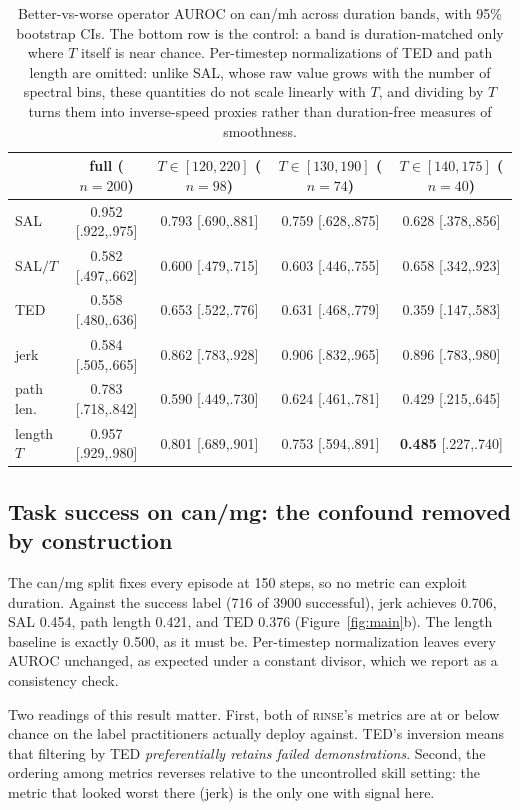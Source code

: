 \documentclass[10pt]{article}
\newcommand{\rinse}{\textsc{rinse}}
\begin{document}
\begin{table}[t]
\centering
\small
\begin{tabular}{lcccc}
\toprule
& full ($n{=}200$) & $T \in [120,220]$ ($n{=}98$) & $T \in [130,190]$ ($n{=}74$) & $T \in [140,175]$ ($n{=}40$) \\
\midrule
SAL       & 0.952 [.922,.975] & 0.793 [.690,.881] & 0.759 [.628,.875] & 0.628 [.378,.856] \\
SAL$/T$   & 0.582 [.497,.662] & 0.600 [.479,.715] & 0.603 [.446,.755] & 0.658 [.342,.923] \\
TED       & 0.558 [.480,.636] & 0.653 [.522,.776] & 0.631 [.468,.779] & 0.359 [.147,.583] \\
jerk      & 0.584 [.505,.665] & 0.862 [.783,.928] & 0.906 [.832,.965] & 0.896 [.783,.980] \\
path len. & 0.783 [.718,.842] & 0.590 [.449,.730] & 0.624 [.461,.781] & 0.429 [.215,.645] \\
\midrule
length $T$ & 0.957 [.929,.980] & 0.801 [.689,.901] & 0.753 [.594,.891] & \textbf{0.485} [.227,.740] \\
\bottomrule
\end{tabular}
\caption{Better-vs-worse operator AUROC on can/mh across duration bands,
with 95\% bootstrap CIs. The bottom row is the control: a band is
duration-matched only where $T$ itself is near chance. Per-timestep
normalizations of TED and path length are omitted: unlike SAL, whose raw
value grows with the number of spectral bins, these quantities do not scale
linearly with $T$, and dividing by $T$ turns them into inverse-speed
proxies rather than duration-free measures of smoothness.}
\label{tab:bands}
\end{table}

\subsection{Task success on can/mg: the confound removed by construction}

The can/mg split fixes every episode at 150 steps, so no metric can exploit
duration. Against the success label (716 of 3900 successful), jerk achieves
0.706, SAL 0.454, path length 0.421, and TED 0.376
(Figure~\ref{fig:main}b). The length baseline is exactly 0.500, as it must
be. Per-timestep normalization leaves every AUROC unchanged, as expected
under a constant divisor, which we report as a consistency check.

Two readings of this result matter. First, both of \rinse{}'s metrics are at
or below chance on the label practitioners actually deploy against. TED's
inversion means that filtering by TED \emph{preferentially retains failed
demonstrations}. Second, the ordering among metrics reverses relative to the
uncontrolled skill setting: the metric that looked worst there (jerk) is the
only one with signal here.
\end{document}
